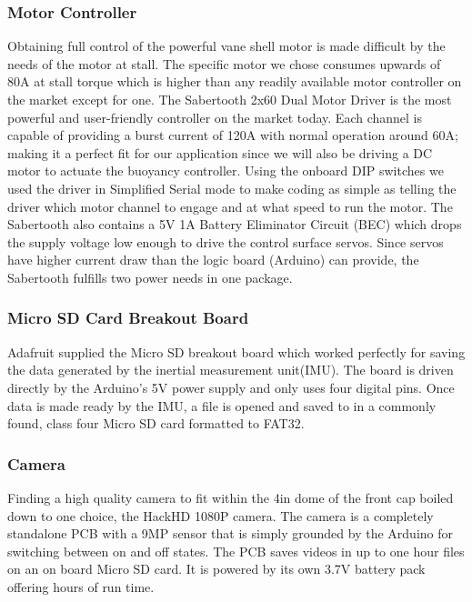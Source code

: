 \documentclass{report}
\begin{document}
\subsubsection{Motor Controller}
Obtaining full control of the powerful vane shell motor is made difficult by the needs of the motor at stall.  The specific motor we chose consumes upwards of 80A at stall torque which is higher than any readily available motor controller on the market except for one.  The Sabertooth 2x60 Dual Motor Driver is the most powerful and user-friendly controller on the market today.  Each channel is capable of providing a burst current of 120A with normal operation around 60A; making it a perfect fit for our application since we will also be driving a DC motor to actuate the buoyancy controller.  Using the onboard DIP switches we used the driver in Simplified Serial mode to make coding as simple as telling the driver which motor channel to engage and at what speed to run the motor.  The Sabertooth also contains a 5V 1A Battery Eliminator Circuit (BEC) which drops the supply voltage low enough to drive the control surface servos.  Since servos have higher current draw than the logic board (Arduino) can provide, the Sabertooth fulfills two power needs in one package.
\subsubsection{Micro SD Card Breakout Board}
Adafruit supplied the Micro SD breakout board which worked perfectly for saving the data generated by the inertial measurement unit(IMU).  The board is driven directly by the Arduino’s 5V power supply and only uses four digital pins.  Once data is made ready by the IMU, a file is opened and saved to in a commonly found,  class four Micro SD card formatted to FAT32.  
\subsubsection{Camera}
Finding a high quality camera to fit within the 4in dome of the front cap boiled down to one choice, the HackHD 1080P camera.  The camera is a completely standalone PCB with a 9MP sensor that is simply grounded by the Arduino for switching between on and off states.  The PCB saves videos in up to one hour files on an on board Micro SD card.  It is powered by its own 3.7V battery pack offering hours of run time.  
\end{document}
